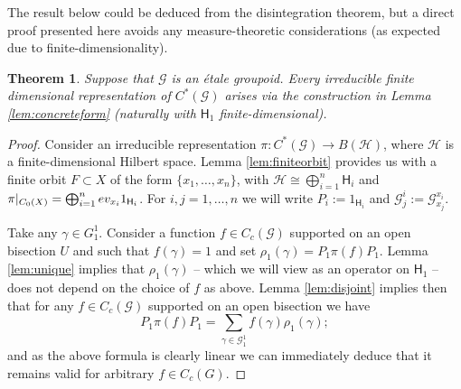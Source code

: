 \documentclass[11 pt, leqno, hidelinks]{amsart}%
\newtheorem{theorem}{Theorem}[section]
\theoremstyle{plain}
\numberwithin{equation}{section}
\newcommand{\GG}{\mathcal{G}}
\newcommand{\Hil}{\mathsf{H}}
\begin{document}
The result below could be deduced from the disintegration theorem, but a direct proof presented here avoids any measure-theoretic considerations (as expected due to finite-dimensionality).



\begin{theorem}\label{th:finitegpd}
	Suppose that $\GG$ is an  \'etale groupoid.
	Every irreducible finite dimensional representation of $C^*(\GG)$ arises via the construction in Lemma \ref{lem:concreteform} (naturally with $\Hil_1$ finite-dimensional).
\end{theorem}

\begin{proof}
	Consider an irreducible representation $\pi:C^*(\GG) \to B(\mathcal{H})$, where $\mathcal{H}$ is a finite-dimensional Hilbert space.  Lemma \ref{lem:finiteorbit} provides us with a finite orbit $F\subset X$ of the form $\{x_1, \ldots, x_n\}$, with  $\mathcal{H} \cong \bigoplus_{i=1}^n \Hil_i$ and $\pi|_{C_0(X)} = \bigoplus_{i=1}^n \textup{ev}_{x_i} 1_{\Hil_i}$. For $i,j=1,\ldots, n$ we will write $P_i:=1_{\Hil_i}$  and $\GG_{j}^i:= \GG_{x_j}^{x_{i}}$.
	

Take any $\gamma\in G_1^1$. Consider a function $f\in C_c(\GG)$ supported on an open bisection $U$ and such that $f(\gamma)=1$ and set $\rho_1(\gamma)= P_1 \pi(f) P_1$. Lemma  \ref{lem:unique} implies that $\rho_1(\gamma)$ -- which we will view as an operator on $\Hil_1$ -- does not depend on the choice of $f$ as above.  Lemma \ref{lem:disjoint} implies then that for any $f \in C_c(\GG)$ supported on an open bisection we have
\[ P_1\pi(f) P_1 = \sum_{\gamma \in \GG_1^1} f(\gamma) \rho_1(\gamma);\]
and as the above formula is clearly linear we can immediately deduce that it remains valid for arbitrary $f \in C_c(G)$.



\end{proof}
\end{document}
